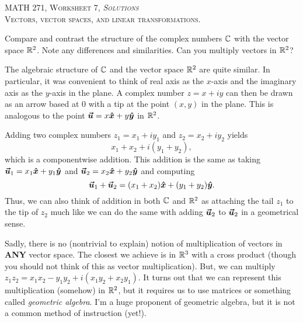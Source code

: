 \documentclass[12pt]{article} %
\begin{document}
\begin{center}
   \textsc{\large MATH 271, Worksheet 7, \emph{Solutions}}\\
   \textsc{Vectors, vector spaces, and linear transformations.}
\end{center}
\vspace{.5cm}

\begin{problem}
Compare and contrast the structure of the complex numbers $\mathbb{C}$ with the vector space $\mathbb{R}^2$.  Note any differences and similarities. Can you multiply vectors in $\mathbb{R}^2$?
\end{problem}
\begin{solution}
    The algebraic structure of $\mathbb{C}$ and the vector space $\mathbb{R}^2$ are quite similar.  In particular, it was convenient to think of real axis as the $x$-axis and the imaginary axis as the $y$-axis in the plane. A complex number $z=x+iy$ can then be drawn as an arrow based at 0 with a tip at the point $(x,y)$ in the plane. This is analogous to the point $\boldsymbol{\boldsymbol{\vec{u}}} = x\boldsymbol{\hat{x}} +y\boldsymbol{\hat{y}}$ in $\mathbb{R}^2$. 

    Adding two complex numbers $z_1=x_1 + i y_1$ and $z_2 = x_2 + iy_2$ yields 
    \[
        x_1 + x_2 + i(y_1 + y_2),
    \]
    which is a componentwise addition. This addition is the same as taking $\boldsymbol{\boldsymbol{\vec{u}}}_1 = x_1 \boldsymbol{\hat{x}} + y_1 \boldsymbol{\hat{y}}$ and $\boldsymbol{\boldsymbol{\vec{u}}}_2 = x_2 \boldsymbol{\hat{x}} + y_2 \boldsymbol{\hat{y}}$ and computing
    \[
        \boldsymbol{\boldsymbol{\vec{u}}}_1 + \boldsymbol{\boldsymbol{\vec{u}}}_2 = (x_1 + x_2) \boldsymbol{\hat{x}} + (y_1 + y_2)\boldsymbol{\hat{y}}.
    \]
    Thus, we can also think of addition in both $\mathbb{C}$ and $\mathbb{R}^2$ as attaching the tail $z_1$ to the tip of $z_2$ much like we can do the same with adding $\boldsymbol{\boldsymbol{\vec{u}}}_2$ to $\boldsymbol{\boldsymbol{\vec{u}}}_2$ in a geometrical sense.

    Sadly, there is no (nontrivial to explain) notion of multiplication of vectors in \textbf{ANY} vector space.  The closest we achieve is in $\mathbb{R}^3$ with a cross product (though you should not think of this as vector multiplication).  But, we can multiply $z_1 z_2 = x_1 x_2 - y_1 y_2 + i(x_1 y_2 + x_2 y_1)$.  It turns out that we can represent this multiplication (somehow) in $\mathbb{R}^2$, but it requires us to use matrices or something called \emph{geometric algebra}.  I'm a huge proponent of geometric algebra, but it is not a common method of instruction (yet!).
\end{solution}
\end{document}
